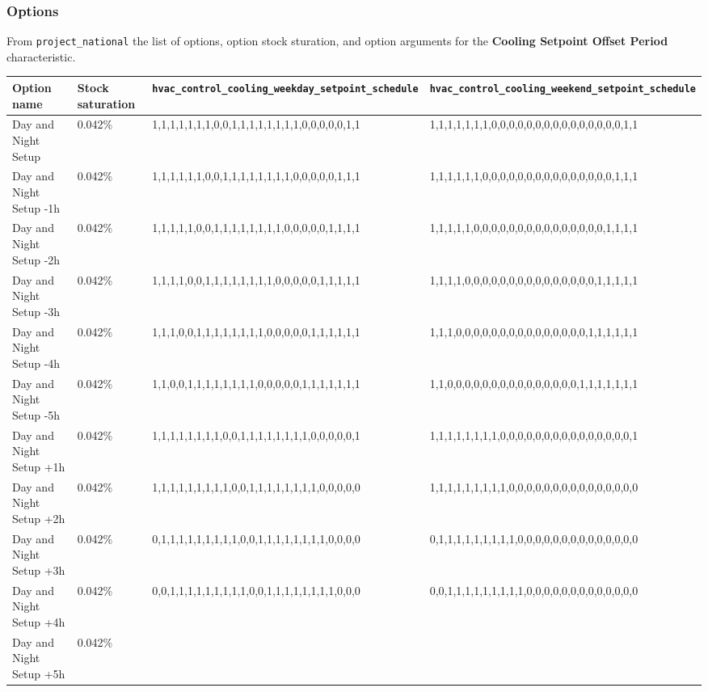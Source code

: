 \subsubsection{Options}\label{options-25}

From \texttt{project\_national} the list of options, option stock
sturation, and option arguments for the \textbf{Cooling Setpoint Offset
Period} characteristic.

\begin{longtable}[]{@{}llll@{}}
\toprule\noalign{}
Option name & Stock saturation &
\texttt{hvac\_control\_cooling\_weekday\_setpoint\_schedule} &
\texttt{hvac\_control\_cooling\_weekend\_setpoint\_schedule} \\
\midrule\noalign{}
\endhead
\bottomrule\noalign{}
\endlastfoot
Day and Night Setup & 0.042\% &
1,1,1,1,1,1,1,0,0,1,1,1,1,1,1,1,1,0,0,0,0,0,1,1 &
1,1,1,1,1,1,1,0,0,0,0,0,0,0,0,0,0,0,0,0,0,0,1,1 \\
Day and Night Setup -1h & 0.042\% &
1,1,1,1,1,1,0,0,1,1,1,1,1,1,1,1,0,0,0,0,0,1,1,1 &
1,1,1,1,1,1,0,0,0,0,0,0,0,0,0,0,0,0,0,0,0,1,1,1 \\
Day and Night Setup -2h & 0.042\% &
1,1,1,1,1,0,0,1,1,1,1,1,1,1,1,0,0,0,0,0,1,1,1,1 &
1,1,1,1,1,0,0,0,0,0,0,0,0,0,0,0,0,0,0,0,1,1,1,1 \\
Day and Night Setup -3h & 0.042\% &
1,1,1,1,0,0,1,1,1,1,1,1,1,1,0,0,0,0,0,1,1,1,1,1 &
1,1,1,1,0,0,0,0,0,0,0,0,0,0,0,0,0,0,0,1,1,1,1,1 \\
Day and Night Setup -4h & 0.042\% &
1,1,1,0,0,1,1,1,1,1,1,1,1,0,0,0,0,0,1,1,1,1,1,1 &
1,1,1,0,0,0,0,0,0,0,0,0,0,0,0,0,0,0,1,1,1,1,1,1 \\
Day and Night Setup -5h & 0.042\% &
1,1,0,0,1,1,1,1,1,1,1,1,0,0,0,0,0,1,1,1,1,1,1,1 &
1,1,0,0,0,0,0,0,0,0,0,0,0,0,0,0,0,1,1,1,1,1,1,1 \\
Day and Night Setup +1h & 0.042\% &
1,1,1,1,1,1,1,1,0,0,1,1,1,1,1,1,1,1,0,0,0,0,0,1 &
1,1,1,1,1,1,1,1,0,0,0,0,0,0,0,0,0,0,0,0,0,0,0,1 \\
Day and Night Setup +2h & 0.042\% &
1,1,1,1,1,1,1,1,1,0,0,1,1,1,1,1,1,1,1,0,0,0,0,0 &
1,1,1,1,1,1,1,1,1,0,0,0,0,0,0,0,0,0,0,0,0,0,0,0 \\
Day and Night Setup +3h & 0.042\% &
0,1,1,1,1,1,1,1,1,1,0,0,1,1,1,1,1,1,1,1,0,0,0,0 &
0,1,1,1,1,1,1,1,1,1,0,0,0,0,0,0,0,0,0,0,0,0,0,0 \\
Day and Night Setup +4h & 0.042\% &
0,0,1,1,1,1,1,1,1,1,1,0,0,1,1,1,1,1,1,1,1,0,0,0 &
0,0,1,1,1,1,1,1,1,1,1,0,0,0,0,0,0,0,0,0,0,0,0,0 \\
Day and Night Setup +5h & 0.042\% &

\end{longtable}

